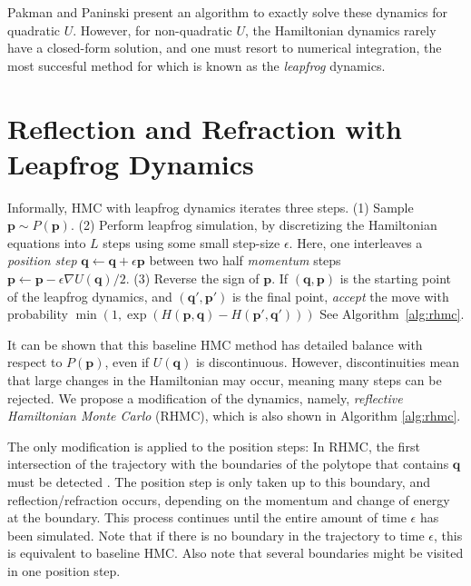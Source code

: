 \documentclass{article} %
\newcommand{\bvec}[1]{\textbf{#1}}
\begin{document}
Pakman and Paninski \cite{pakman2014exact, pakman2013auxiliary} present an algorithm to exactly solve these dynamics for quadratic $U$.  However, for non-quadratic $U$, the Hamiltonian dynamics rarely have a closed-form solution, and one must resort to numerical integration, the most succesful method for which is known as the \emph{leapfrog} dynamics.




\section{Reflection and Refraction with Leapfrog Dynamics}

Informally, HMC with leapfrog dynamics iterates three steps. (1) Sample $\bvec{p} \sim P(\bvec{p})$. (2) Perform leapfrog simulation, by discretizing the Hamiltonian equations into $L$ steps using some small step-size $\epsilon$.  Here, one interleaves a \emph{position step} 
$\bvec{q} \leftarrow \bvec{q} + \epsilon \bvec{p}$ 
between two half \emph{momentum} steps $\bvec{p} \leftarrow \bvec{p} - \epsilon \nabla U(\bvec{q})/2.$ (3) Reverse the sign of $\bvec{p}$. If $(\bvec{q},\bvec{p})$ is the starting point of the leapfrog dynamics, and $(\bvec{q}', \bvec{p}')$ is the final point, \emph{accept} the move with probability $\min(1,\exp(H(\bvec{p},\bvec{q})-H(\bvec{p}', \bvec{q}')))$  See Algorithm~\ref{alg:rhmc}.

It can be shown that this baseline HMC method has detailed balance with respect to $P(\bvec{p})$, even if $U(\bvec{q})$ is discontinuous.  However, discontinuities mean that large changes in the Hamiltonian may occur, meaning many steps can be rejected.  We propose a modification of the dynamics, namely, \emph{reflective Hamiltonian Monte Carlo} (RHMC), which is also shown in Algorithm \ref{alg:rhmc}.  

The only modification is applied to the position steps: In RHMC, the first intersection of the trajectory with the boundaries of the polytope that contains $\bvec{q}$ must be detected \cite{pakman2014exact, pakman2013auxiliary}.  The position step is only taken up to this boundary, and reflection/refraction occurs, depending on the momentum and change of energy at the boundary.  This process continues until the entire amount of time $\epsilon$ has been simulated.  Note that if there is no boundary in the trajectory to time $\epsilon$, this is equivalent to baseline HMC.  Also note that several boundaries might be visited in one position step.
\end{document}
